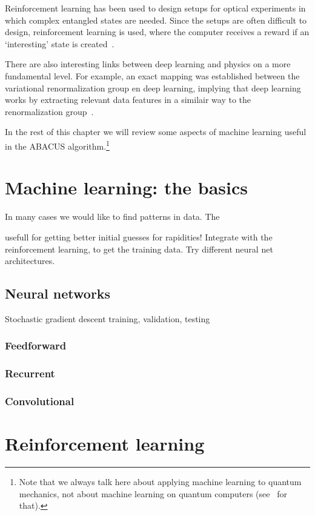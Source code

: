 \documentclass[11pt, a4paper]{report} %
\begin{document}
Reinforcement learning has been used to design setups for optical experiments in which complex entangled states are needed.
Since the setups are often difficult to design, reinforcement learning is used, where the computer receives a reward if an `interesting' state is created~\cite{dunjko17_machin_learn_artif_intel_quant_domain}.

There are also interesting links between deep learning and physics on a more fundamental level.
For example, an exact mapping was established between the variational renormalization group en deep learning, implying that deep learning works by extracting relevant data features in a similair way to the renormalization group~\cite{Mehta2014}. 

In the rest of this chapter we will review some aspects of machine learning useful in the ABACUS algorithm.\footnote{Note that we always talk here about applying machine learning to quantum mechanics, not about machine learning on quantum computers (see~\cite{Dunjko2017} for that).}


\section{Machine learning: the basics}
In many cases we would like to find patterns in data.
The 

usefull for getting better initial guesses for rapidities!
Integrate with the reinforcement learning, to get the training data. Try different neural net architectures.
\subsection{Neural networks}
Stochastic gradient descent
training, validation, testing
\subsubsection{Feedforward}
\subsubsection{Recurrent}
\subsubsection{Convolutional}



\section{Reinforcement learning}
\end{document}
